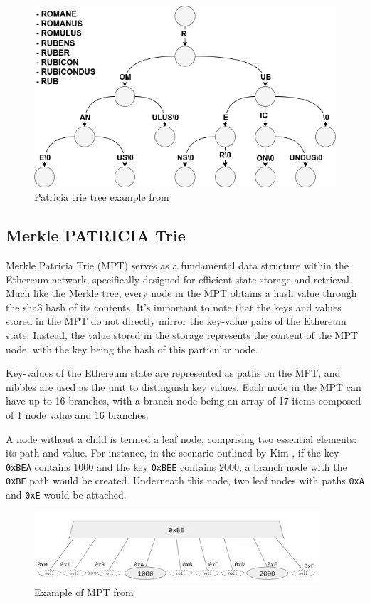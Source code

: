 \documentclass[fleqn,10pt]{olplainarticle}
\begin{document}
\begin{figure}[h]
	\centering
	\includegraphics[width=0.8\linewidth]{img/PATRICIA-TrieAdd}
	\caption{Patricia trie tree example from \cite{eisler_trie_2013}}
	\label{fig:PatriciaTrieAdd}
\end{figure}

\subsection{Merkle PATRICIA Trie}

Merkle Patricia Trie (MPT) serves as a fundamental data structure within the Ethereum network, specifically designed for efficient state storage and retrieval. Much like the Merkle tree, every node in the MPT obtains a hash value through the sha3 hash of its contents. It's important to note that the keys and values stored in the MPT do not directly mirror the key-value pairs of the Ethereum state. Instead, the value stored in the storage represents the content of the MPT node, with the key being the hash of this particular node.

Key-values of the Ethereum state are represented as paths on the MPT, and nibbles are used as the unit to distinguish key values. Each node in the MPT can have up to 16 branches, with a branch node being an array of 17 items composed of 1 node value and 16 branches.

A node without a child is termed a leaf node, comprising two essential elements: its path and value. For instance, in the scenario outlined by Kim \cite{kim_Ethereum_MPT_2018}, if the key \texttt{0xBEA} contains 1000 and the key \texttt{0xBEE} contains 2000, a branch node with the \texttt{0xBE} path would be created. Underneath this node, two leaf nodes with paths \texttt{0xA} and \texttt{0xE} would be attached.

\begin{figure}[H]
	\centering
	\includegraphics[width=0.7\linewidth]{img/MPT_E1}
	\caption{Example of MPT from  \cite{kim_Ethereum_MPT_2018}}
	\label{fig:mpte1}
\end{figure}
\end{document}

